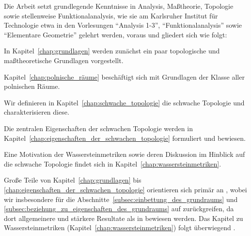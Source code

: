 \documentclass[../thesis/thesis.tex]{subfiles}
\begin{document}
	Die Arbeit setzt grundlegende Kenntnisse in Analysis, Maßtheorie, Topologie sowie stellenweise Funktionalanalysis, wie sie am Karlsruher 
	Institut für Technologie etwa in den Vorlesungen
	\enquote{Analysis 1-3}, \enquote{Funktionalanalysis} sowie \enquote{Elementare Geometrie} gelehrt werden, voraus und gliedert sich wie folgt: 
	\begin{itemizethm}
		\item In Kapitel~\ref{chap:grundlagen} werden zunächst ein paar topologische und maßtheoretische Grundlagen vorgestellt.
		\item Kapitel~\ref{chap:polnische_räume} beschäftigt sich mit Grundlagen der Klasse aller polnischen Räume.
		\item Wir definieren in Kapitel~\ref{chap:schwache_topologie} die schwache Topologie und charakterisieren diese.
		\item Die zentralen Eigenschaften der schwachen Topologie werden in Kapitel~\ref{chap:eigenschaften_der_schwachen_topologie}
		formuliert und bewiesen.
		\item Eine Motivation der Wassersteinmetriken sowie deren Diskussion im Hinblick auf die schwache Topologie findet sich in Kapitel~\ref{chap:wassersteinmetriken}.
	\end{itemizethm}

	Große Teile von Kapitel~\ref{chap:grundlagen} bis \ref{chap:eigenschaften_der_schwachen_topologie} orientieren sich primär an \cite[Kapitel 4.14]{Simon.2015}, 
	wobei wir insbesondere für die Abschnitte~\ref{subsec:einbettung_des_grundraums} und \ref{subsec:beziehung_zu_eigenschaften_des_grundraums} auf \cite{Varadarajan.1958}
	zurückgreifen, da dort allgemeinere und stärkere Resultate als in \cite{Simon.2015} bewiesen werden. Das Kapitel zu Wassersteinmetriken (Kapitel~\ref{chap:wassersteinmetriken})
	folgt überwiegend \cite[Kapitel 4 bis 6]{Villani.2009}.
	
	
	
\end{document}
